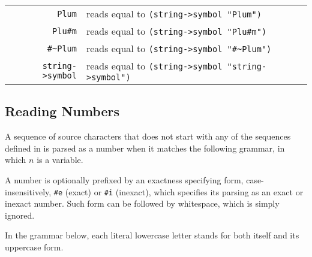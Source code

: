 \begin{tabular}{ r l }
  \lstinline!Plum! & reads equal to \lstinline!(string->symbol "Plum")! \\
  \lstinline!Plu#m! & reads equal to \lstinline!(string->symbol "Plu#m")! \\
  \lstinline!#~Plum! & reads equal to \lstinline!(string->symbol "#~Plum")! \\
  \lstinline!string->symbol! & reads equal to \lstinline!(string->symbol "string->symbol")! \\
\end{tabular}




\subsection{Reading Numbers}
\label{subsec:aml-base-lang-reader-numbers}

A sequence of source characters that does not start with any of the sequences defined in  is parsed as a number when it matches the following grammar, in which $n$ is a variable.

A number is optionally prefixed by an exactness specifying form, case-insensitively, \lstinline!#e! (exact) or \lstinline!#i! (inexact), which specifies its parsing as an exact or inexact number. Such form can be followed by whitespace, which is simply ignored.


In the grammar below, each literal lowercase letter stands for both itself and its uppercase form.

